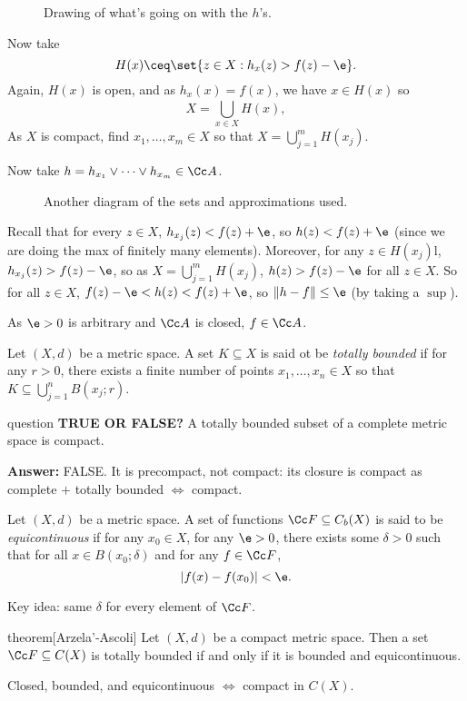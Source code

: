 \documentclass[class=article, crop=false]{standalone}
\begin{document}
\begin{pf}
  \begin{figure}[ht]
    \center
    \caption{Drawing of what's going on with the $h$'s.}
  \end{figure}


  Now take
    \[
      H(x) \ceq \set{z \in X : h_x(z) > f(z)-\e}.
    \]
  Again, $H(x)$ is open, and as $h_x(x)=f(x)$, we have $x \in H(x)$ so
    \[
      X = \bigcup_{x \in X}^{} H(x),
    \]
  As $X$ is compact, find $x_1, \ldots, x_m \in X$ so that $X = \bigcup_{j=1}^{m} H(x_j)$.

  Now take $h = h_{x_1} \lor \cdots \lor h_{x_m} \in \Cc A$.

  \begin{figure}[ht]
    \center
    \caption{Another diagram of the sets and approximations used.}
  \end{figure}


  Recall that for every $z \in X$, $h_{x_j}(z) < f(z)+\e$, so $h(z) < f(z)+\e$ (since we are doing the max of finitely many elements). Moreover, for any $z \in H(x_j)$l, $h_{x_j}(z) > f(z)-\e$, so as $X = \bigcup_{j=1}^{m} H(x_j)$, $h(z) > f(z)-\e$ for all $z \in X$. So for all $z\in X$, $f(z)-\e < h(z) < f(z) + \e$, so $\|h-f\| \leq\e$ (by taking a $\sup$).

  As $\e > 0$ is arbitrary and $\Cc A$ is closed, $f \in \Cc A$.
\end{pf}

\begin{defn}
  Let $(X,d)$ be a metric space. A set $K \subseteq X$ is said ot be \emph{totally bounded} if for any $r > 0$, there exists a finite number of points $x_1,\ldots,x_n \in X$ so that $K \subseteq \bigcup_{j=1}^{n} B(x_j;r)$.
\end{defn}

\begin{understandingcheck}{question}
  \textbf{TRUE OR FALSE?} A totally bounded subset of a complete metric space is compact.

  \textbf{Answer:} FALSE. It is precompact, not compact: its closure is compact as complete $+$ totally bounded $\iff$ compact.
\end{understandingcheck}

\begin{defn}
  Let $(X,d)$ be a metric space. A set of functions $\Cc F \subseteq C_b(X)$ is said to be \emph{equicontinuous} if for any $x_0 \in X$, for any $\e > 0$, there exists some $\delta > 0$ such that for all $x \in B(x_0; \delta)$ and for any $f \in \Cc F$,
    \[
      |f(x)-f(x_0)|< \e.
    \]
\end{defn}
\begin{rem}
  Key idea: same $\delta$ for every element of $\Cc F$.
\end{rem}

\begin{result}{theorem}[Arzela'-Ascoli]
  Let $(X,d)$ be a compact metric space. Then a set $\Cc F \subseteq C(X)$ is totally bounded if and only if it is bounded and equicontinuous.
\end{result}
\begin{rem}
  Closed, bounded, and equicontinuous $\iff$ compact in $C(X)$.
\end{rem}
\end{document}
